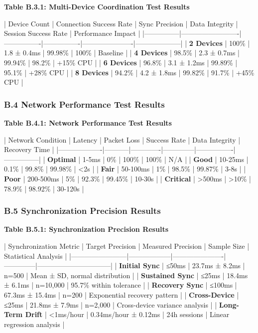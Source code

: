\documentclass[11pt,a4paper]{article}
\begin{document}
\textbf{Table B.3.1: Multi-Device Coordination Test Results}

| Device Count  | Connection Success Rate | Sync Precision | Data Integrity | Session Success Rate | Performance Impact |
|---------------|-------------------------|----------------|----------------|----------------------|--------------------|
| \textbf{2 Devices} | 100\%                    | 1.8 ± 0.4ms    | 99.98\%         | 100\%                 | Baseline           |
| \textbf{4 Devices} | 98.5\%                   | 2.3 ± 0.7ms    | 99.94\%         | 98.2\%                | +15\% CPU           |
| \textbf{6 Devices} | 96.8\%                   | 3.1 ± 1.2ms    | 99.89\%         | 95.1\%                | +28\% CPU           |
| \textbf{8 Devices} | 94.2\%                   | 4.2 ± 1.8ms    | 99.82\%         | 91.7\%                | +45\% CPU           |

\subsubsection{B.4 Network Performance Test Results}

\textbf{Table B.4.1: Network Performance Test Results}

| Network Condition | Latency   | Packet Loss | Success Rate | Data Integrity | Recovery Time |
|-------------------|-----------|-------------|--------------|----------------|---------------|
| \textbf{Optimal}       | 1-5ms     | 0\%          | 100\%         | 100\%           | N/A           |
| \textbf{Good}          | 10-25ms   | 0.1\%        | 99.8\%        | 99.98\%         | <2s           |
| \textbf{Fair}          | 50-100ms  | 1\%          | 98.5\%        | 99.87\%         | 3-8s          |
| \textbf{Poor}          | 200-500ms | 5\%          | 92.3\%        | 99.45\%         | 10-30s        |
| \textbf{Critical}      | >500ms    | >10\%        | 78.9\%        | 98.92\%         | 30-120s       |

\subsubsection{B.5 Synchronization Precision Results}

\textbf{Table B.5.1: Synchronization Precision Results}

| Synchronization Metric | Target Precision | Measured Precision   | Sample Size  | Statistical Analysis           |
|------------------------|------------------|----------------------|--------------|--------------------------------|
| \textbf{Initial Sync}       | ≤50ms            | 23.7ms ± 8.2ms       | n=500        | Mean ± SD, normal distribution |
| \textbf{Sustained Sync}     | ≤25ms            | 18.4ms ± 6.1ms       | n=10,000     | 95.7\% within tolerance         |
| \textbf{Recovery Sync}      | ≤100ms           | 67.3ms ± 15.4ms      | n=200        | Exponential recovery pattern   |
| \textbf{Cross-Device}       | ≤25ms            | 21.8ms ± 7.9ms       | n=2,000      | Cross-device variance analysis |
| \textbf{Long-Term Drift}    | <1ms/hour        | 0.34ms/hour ± 0.12ms | 24h sessions | Linear regression analysis     |
\end{document}
